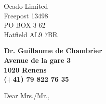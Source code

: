 \documentclass[11pt]{letter} %
\begin{document}

\begin{letter}{Ocado Limited\\ Freepost 13498\\ PO BOX 3 62\\ Hatfield AL9 7BR} 


\begin{center}
\large\bf Dr. Guillaume de Chambrier \\ %
Avenue de la gare 3 \\ 1020 Renens \\ (+41) 79 822 76 35 %
\end{center} 
\vfill

\signature{Guillaume de Chambrier} %


\opening{Dear Mrs./Mr.,} 








\end{letter}
\end{document}
